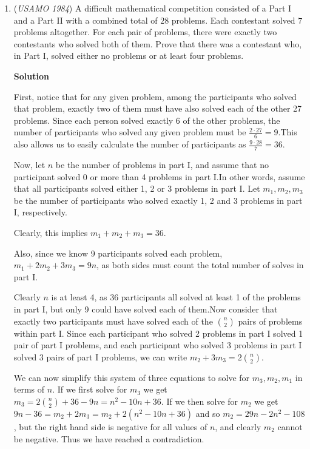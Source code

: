 \begin{enumerate}
	\item (\textit{USAMO 1984}) A difficult mathematical competition consisted of a Part I and a Part II with a combined total of $28$ problems. Each contestant solved $7$ problems altogether. For each pair of problems, there were exactly two contestants who solved both of them. Prove that there was a contestant who, in Part I, solved either no problems or at least four problems.


 



\textbf{Solution}

First, notice that for any given problem, among the participants who solved that problem, exactly two of them must have also solved each of the other 27 problems. Since each person solved exactly 6 of the other problems, the number of participants who solved any given problem must be $\frac{2\cdot 27}{6} = 9$.This also allows us to easily calculate the number of participants as $\frac{9\cdot 28}{7} = 36$.

 Now, let $n$ be the number of problems in part I, and assume that no participant solved 0 or more than 4 problems in part I.In other words, assume that all participants solved either 1, 2 or 3 problems in part I. Let $m_1, m_2, m_3$ be the number of participants who solved exactly 1, 2 and 3 problems in part I, respectively.

 Clearly, this implies $m_1+m_2+m_3 = 36$.

 Also, since we know 9 participants solved each problem, $m_1+2m_2+3m_3 = 9n$, as both sides must count the total number of solves in part I.

 Clearly $n$ is at least 4, as 36 participants all solved at least 1 of the problems in part I, but only 9 could have solved each of them.Now consider that exactly two participants must have solved each of the $\binom{n}{2}$ pairs of problems within part I. Since each participant who solved 2 problems in part I solved 1 pair of part I problems, and each participant who solved 3 problems in part I solved 3 pairs of part I problems, we can write $m_2 + 3m_3 = 2\binom{n}{2}$.

 We can now simplify this system of three equations to solve for $m_3, m_2, m_1$ in terms of $n$. If we first solve for $m_3$ we get $m_3 = 2\binom{n}{2} + 36 - 9n = n^2 - 10n + 36$. If we then solve for $m_2$ we get $9n-36 = m_2 + 2m_3 = m_2 + 2(n^2-10n+36)$ and so $m_2 = 29n - 2n^2 - 108$, but the right hand side is negative for all values of $n$, and clearly $m_2$ cannot be negative. Thus we have reached a contradiction.


\end{enumerate}

